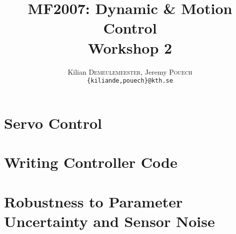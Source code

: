 \documentclass[a4paper,10pt,twocolumn]{article}
\title{MF2007: Dynamic \& Motion Control \\ Workshop 2}
\author{Kilian \textsc{Demeulemeester}, Jeremy \textsc{Pouech} \\ \texttt{\{kiliande,pouech\}@kth.se}}
\begin{document}
\setlength\parindent{0em}

\maketitle

\tableofcontents

\begin{abstract}
 
\end{abstract}
  

\part*{Servo Control} 

	
\clearpage

\part*{Writing Controller Code} 

	

\clearpage

\part*{Robustness to Parameter Uncertainty and Sensor Noise}



\clearpage

\appendix

\onecolumn


\end{document}
